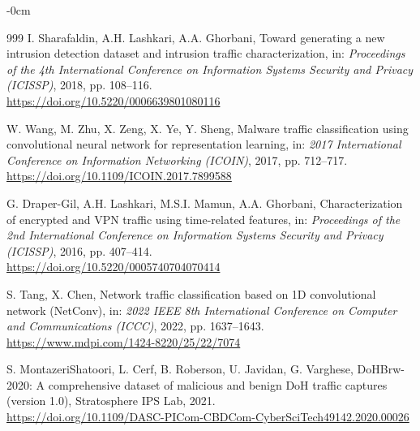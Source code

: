 \documentclass[sensors,article,submit,moreauthors]{Definitions/mdpi}
\begin{document}
\begin{adjustwidth}{-\extralength}{0cm}
\begin{thebibliography}{999}
I. Sharafaldin, A.H. Lashkari, A.A. Ghorbani, Toward generating a new intrusion detection dataset and intrusion traffic characterization, in: \textit{Proceedings of the 4th International Conference on Information Systems Security and Privacy (ICISSP)}, 2018, pp. 108--116. \\
\url{https://doi.org/10.5220/0006639801080116}



W. Wang, M. Zhu, X. Zeng, X. Ye, Y. Sheng, Malware traffic classification using convolutional neural network for representation learning, in: \textit{2017 International Conference on Information Networking (ICOIN)}, 2017, pp. 712--717. \\
\url{https://doi.org/10.1109/ICOIN.2017.7899588}



G. Draper-Gil, A.H. Lashkari, M.S.I. Mamun, A.A. Ghorbani, Characterization of encrypted and VPN traffic using time-related features, in: \textit{Proceedings of the 2nd International Conference on Information Systems Security and Privacy (ICISSP)}, 2016, pp. 407--414. \\
\url{https://doi.org/10.5220/0005740704070414}



S. Tang, X. Chen, Network traffic classification based on 1D convolutional network (NetConv), in: \textit{2022 IEEE 8th International Conference on Computer and Communications (ICCC)}, 2022, pp. 1637--1643. \\
\url{https://www.mdpi.com/1424-8220/25/22/7074}



S. MontazeriShatoori, L. Cerf, B. Roberson, U. Javidan, G. Varghese, DoHBrw-2020: A comprehensive dataset of malicious and benign DoH traffic captures (version 1.0), Stratosphere IPS Lab, 2021. \\
\url{https://doi.org/10.1109/DASC-PICom-CBDCom-CyberSciTech49142.2020.00026}

\end{thebibliography}


\PublishersNote{}
\end{adjustwidth}
\end{document}
